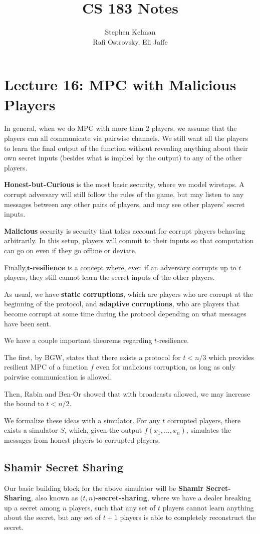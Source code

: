 \documentclass[11pt]{article}
\title{CS 183 Notes}
\author{Stephen Kelman\\ Rafi Ostrovsky, Eli Jaffe}
\newcommand{\tb}{\textbf}
\newcommand{\mb}{\mathbf}
\begin{document}
\section{Lecture 16: MPC with Malicious Players}
In general, when we do MPC with more than 2 players, we assume that the players can all communicate via pairwise channels.
We still want all the players to learn the final output of the function without revealing anything about their own secret inputs (besides what is implied by the output) to any of the other players.\smallskip

\tb{Honest-but-Curious} is the most basic security, where we model wiretaps.
A corrupt adversary will still follow the rules of the game, but may listen to any messages between any other pairs of players,
and may see other players' secret inputs.\smallskip

\tb{Malicious} security is security that takes account for corrupt players behaving arbitrarily. 
In this setup, players will commit to their inputs so that computation can go on even if they go offline or deviate.\smallskip

Finally,\tb{\(\mb{t}\)-resilience} is a concept where, even if an adversary corrupts up to \({t}\) players,
they still cannot learn the secret inputs of the other players.\smallskip

As usual, we have \tb{static corruptions}, which are players who are corrupt at the beginning of the protocol,
and \tb{adaptive corruptions}, who are players that become corrupt at some time during the protocol depending on what messages have been sent.\medskip

We have a couple important theorems regarding \(t\)-resilience.\smallskip

The first, by BGW,  states that there exists a protocol for \(t<n/3\) which provides resilient MPC of a function \(f\) even for malicious corruption, as long as only pairwise communication is allowed.\smallskip

Then, Rabin and Ben-Or showed that with broadcasts allowed, we may increase the bound to \(t<n/2\).\medskip

We formalize these ideas with a simulator.
For any \(t\) corrupted players, there exists a simulator \(S\), which, given the output \(f(x_1,\ldots,x_n)\), simulates the messages from honest players to corrupted players.

\subsection{Shamir Secret Sharing}
Our basic building block for the above simulator will be \tb{Shamir Secret-Sharing}, also known as \(\mb(t,n)\)\tb{-secret-sharing}, where we have a dealer breaking up a secret among \(n\) players, such that any set of \(t\) players cannot learn anything about the secret, but any set of \(t+1\) players is able to completely reconstruct the secret.\smallskip
\end{document}
